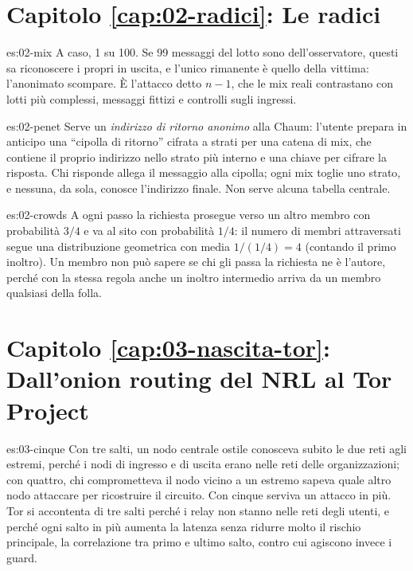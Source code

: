 \section*{Capitolo \ref{cap:02-radici}: Le radici}

\begin{soluzione}{es:02-mix}
A caso, 1 su 100. Se 99 messaggi del lotto sono dell'osservatore, questi sa riconoscere i propri in uscita, e l'unico rimanente è quello della vittima: l'anonimato scompare. È l'attacco detto \emph{$n-1$}, che le mix reali contrastano con lotti più complessi, messaggi fittizi e controlli sugli ingressi.
\end{soluzione}

\begin{soluzione}{es:02-penet}
Serve un \emph{indirizzo di ritorno anonimo} alla Chaum: l'utente prepara in anticipo una \enquote{cipolla di ritorno} cifrata a strati per una catena di mix, che contiene il proprio indirizzo nello strato più interno e una chiave per cifrare la risposta. Chi risponde allega il messaggio alla cipolla; ogni mix toglie uno strato, e nessuna, da sola, conosce l'indirizzo finale. Non serve alcuna tabella centrale.
\end{soluzione}

\begin{soluzione}{es:02-crowds}
A ogni passo la richiesta prosegue verso un altro membro con probabilità $3/4$ e va al sito con probabilità $1/4$: il numero di membri attraversati segue una distribuzione geometrica con media $1/(1/4) = 4$ (contando il primo inoltro). Un membro non può sapere se chi gli passa la richiesta ne è l'autore, perché con la stessa regola anche un inoltro intermedio arriva da un membro qualsiasi della folla.
\end{soluzione}

\section*{Capitolo \ref{cap:03-nascita-tor}: Dall'onion routing del NRL al Tor Project}

\begin{soluzione}{es:03-cinque}
Con tre salti, un nodo centrale ostile conosceva subito le due reti agli estremi, perché i nodi di ingresso e di uscita erano nelle reti delle organizzazioni; con quattro, chi comprometteva il nodo vicino a un estremo sapeva quale altro nodo attaccare per ricostruire il circuito. Con cinque serviva un attacco in più. Tor si accontenta di tre salti perché i relay non stanno nelle reti degli utenti, e perché ogni salto in più aumenta la latenza senza ridurre molto il rischio principale, la correlazione tra primo e ultimo salto, contro cui agiscono invece i guard.
\end{soluzione}

